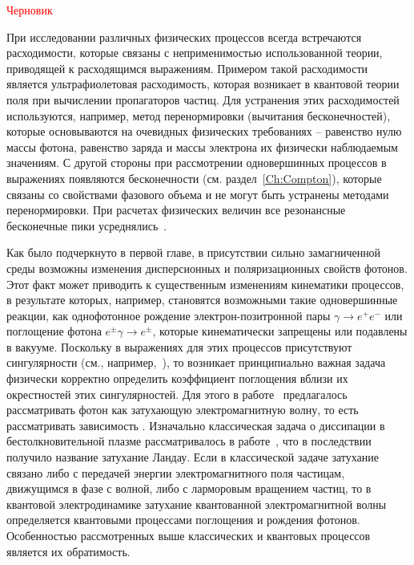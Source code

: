 \textcolor{red}{Черновик}

При исследовании различных физических процессов всегда встречаются расходимости, которые связаны с неприменимостью использованной теории, приводящей к расходящимся выражениям. Примером такой расходимости является ультрафиолетовая расходимость, которая возникает в квантовой теории поля при вычислении пропагаторов частиц. Для устранения этих расходимостей используются, например, метод перенормировки (вычитания бесконечностей), которые основываются на очевидных физических требованиях -- равенство нулю массы фотона, равенство заряда и массы электрона их физически наблюдаемым значениям. С другой стороны при рассмотрении одновершинных процессов в выражениях появляются  бесконечности (см. раздел~\ref{Ch:Compton}), которые связаны со свойствами фазового объема и не могут быть устранены методами перенормировки.
При расчетах физических величин все резонансные бесконечные пики усреднялись~\cite{Baier:2007}.

Как было подчеркнуто в первой главе, в присутствии сильно замагниченной среды 
возможны изменения дисперсионных и поляризационных свойств фотонов. Этот факт 
может приводить к существенным изменениям кинематики процессов, в результате 
которых, например, становятся возможными такие одновершинные реакции, как однофотонное 
рождение электрон-позитронной пары $\gamma\to e^+e^-$ или поглощение фотона 
$e^{\pm}\gamma\to e^{\pm}$, которые кинематически запрещены или подавлены в 
вакууме. Поскольку в выражениях для этих процессов присутствуют сингулярности (см., например,~\cite{Klepikov:1954,Sturrock:1971,Tademaru:1973,Daugherty:1983,Shabad:1988}), то возникает принципиально важная задача физически корректно определить коэффициент поглощения вблизи их окрестностей этих сингулярностей.
Для этого в работе~\cite{Shabad:1988} предлагалось рассматривать фотон как затухающую электромагнитную волну, то есть рассматривать зависимость . Изначально классическая задача о диссипации  в бестолкновительной плазме рассматривалось в работе~\cite{Landau:1946}, что в последствии получило название затухание Ландау. Если в классической задаче затухание связано либо с передачей энергии электромагнитного поля частицам, движущимся в фазе с волной, либо с ларморовым вращением частиц, то в квантовой электродинамике затухание квантованной электромагнитной волны определяется квантовыми процессами поглощения и рождения фотонов. Особенностью рассмотренных выше классических и квантовых процессов является их обратимость.

